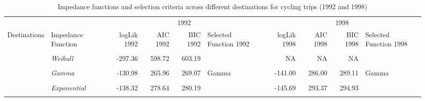 \documentclass[
11pt, %
oneside, %
english, %
singlespacing, %
]{macthesis} %
\begin{document}
\begin{landscape}\begin{table}[!h]

\caption{\label{tab:table-imc1}\label{tab:table_18}Impedance functions and selection criteria across different destinations for cycling trips (1992 and 1998)}
\centering
\fontsize{7}{9}\selectfont
\begin{tabular}[t]{>{}l|>{}lrrrlrrrl}
\toprule
\multicolumn{2}{c}{ } & \multicolumn{4}{c}{1992} & \multicolumn{4}{c}{1998} \\
\cmidrule(l{3pt}r{3pt}){3-6} \cmidrule(l{3pt}r{3pt}){7-10}
Destinations & Impedance
Function & logLik
1992 & AIC
1992 & BIC
1992 & Selected
Function
1992 & logLik
1998 & AIC
1998 & BIC
1998 & Selected
Function
1998\\
\midrule
\textbf{\cellcolor{gray!6}{}} & \em{\cellcolor{gray!6}{Gamma}} & \cellcolor{gray!6}{-296.80} & \cellcolor{gray!6}{597.61} & \cellcolor{gray!6}{602.07} & \cellcolor{gray!6}{Gamma} & \cellcolor{gray!6}{-250.55} & \cellcolor{gray!6}{505.09} & \cellcolor{gray!6}{509.38} & \cellcolor{gray!6}{Gamma}\\
\cmidrule{2-10}
\textbf{} & \em{Weibull} & -297.36 & 598.72 & 603.19 &  & NA & NA & NA & \\
\cmidrule{2-10}
\textbf{\cellcolor{gray!6}{\multirow[t]{-3}{*}{\raggedright\arraybackslash Home}}} & \em{\cellcolor{gray!6}{Exponential}} & \cellcolor{gray!6}{-299.38} & \cellcolor{gray!6}{600.77} & \cellcolor{gray!6}{603.00} & \cellcolor{gray!6}{} & \cellcolor{gray!6}{-253.36} & \cellcolor{gray!6}{508.72} & \cellcolor{gray!6}{510.86} & \cellcolor{gray!6}{}\\
\cmidrule{1-10}
\textbf{} & \em{Gamma} & -130.98 & 265.96 & 269.07 & Gamma & -141.00 & 286.00 & 289.11 & Gamma\\
\cmidrule{2-10}
\textbf{\cellcolor{gray!6}{}} & \em{\cellcolor{gray!6}{Weibull}} & \cellcolor{gray!6}{-131.06} & \cellcolor{gray!6}{266.11} & \cellcolor{gray!6}{269.22} & \cellcolor{gray!6}{} & \cellcolor{gray!6}{-141.71} & \cellcolor{gray!6}{287.42} & \cellcolor{gray!6}{290.53} & \cellcolor{gray!6}{}\\
\cmidrule{2-10}
\textbf{} & \em{Exponential} & -138.32 & 278.64 & 280.19 &  & -145.69 & 293.37 & 294.93 & \\
\cmidrule{2-10}
\textbf{\cellcolor{gray!6}{}} & \em{\cellcolor{gray!6}{Normal}} & \cellcolor{gray!6}{-134.55} & \cellcolor{gray!6}{273.10} & \cellcolor{gray!6}{276.21} & \cellcolor{gray!6}{} & \cellcolor{gray!6}{-148.73} & \cellcolor{gray!6}{301.45} & \cellcolor{gray!6}{304.56} & \cellcolor{gray!6}{}\\

\end{tabular}
\end{table}
\end{landscape}
\end{document}
